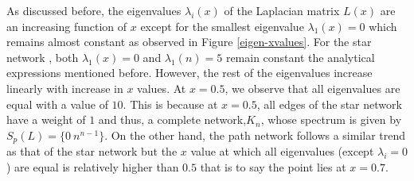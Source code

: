 \documentclass[10pt,a4paper]{article}
\begin{document}
As discussed before, the eigenvalues $\lambda_i(x)$ of the Laplacian matrix $L(x)$ are an increasing function of $x$ except for the smallest eigenvalue $\lambda_1(x) = 0$ which remains almost constant as observed in Figure \ref{eigen-xvalues}. For the star network , both $\lambda_1(x) = 0$ and $\lambda_1(n) = 5$ remain constant the analytical expressions mentioned before. However, the rest of the eigenvalues increase linearly with increase in $x$ values. At $x=0.5$, we observe that all eigenvalues are equal with a value of $10$. This is because at $x=0.5$, all edges of the star network have a weight of $1$ and thus, a complete network,$K_n$, whose spectrum is given by $S_p(L) = \{0~ n^{n-1} \}$. On the other hand, the path network follows a similar trend as that of the star network but the $x$ value at which all eigenvalues (except $\lambda_i=0$) are equal is relatively higher than $0.5$ that is to say the point lies at $x=0.7$. 

\newpage
\end{document}
